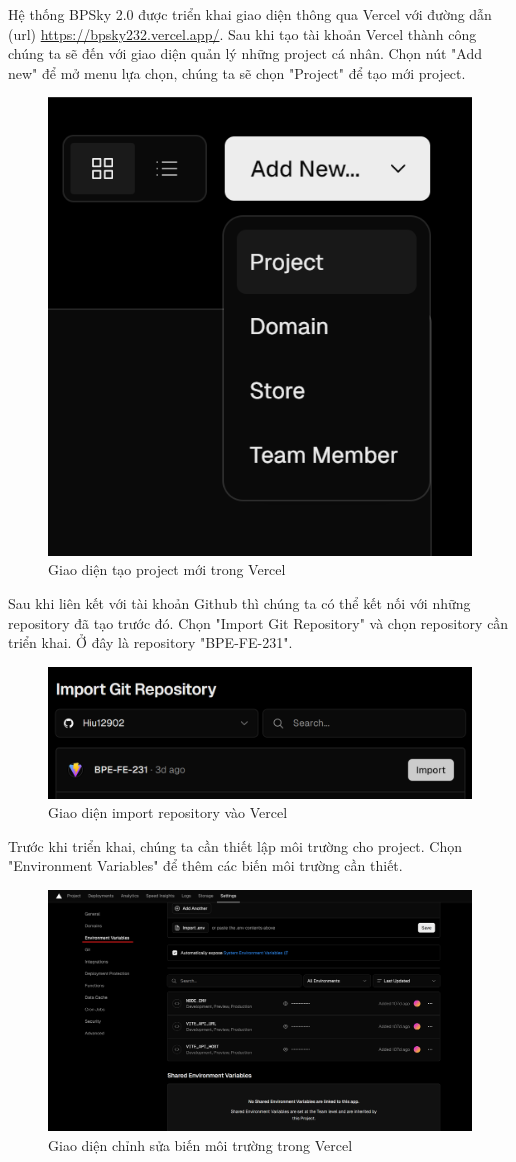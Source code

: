 Hệ thống BPSky 2.0 được triển khai giao diện thông qua Vercel với đường dẫn (url) \url{https://bpsky232.vercel.app/}. Sau khi tạo tài khoản Vercel thành công chúng ta sẽ đến với giao diện quản lý những project cá nhân. Chọn nút "Add new" để mở menu lựa chọn, chúng ta sẽ chọn "Project" để tạo mới project.

\begin{figure}[H]
    \centering
    \includegraphics[width=0.3\linewidth]{Content/Hiện thực hệ thống/images/createProjectVercel.png}
    \vspace{0.5cm}
    \caption{Giao diện tạo project mới trong Vercel}
    \label{fig:Tạo project mới trong Vercel}
\end{figure}

Sau khi liên kết với tài khoản Github thì chúng ta có thể kết nối với những repository đã tạo trước đó. Chọn "Import Git Repository" và chọn repository cần triển khai. Ở đây là repository "BPE-FE-231".

\begin{figure}[H]
    \centering
    \includegraphics[width=0.5\linewidth]{Content/Hiện thực hệ thống/images/importRepoVercel.png}
    \vspace{0.5cm}
    \caption{Giao diện import repository vào Vercel}
    \label{fig:Import repository vào Vercel}
\end{figure}

Trước khi triển khai, chúng ta cần thiết lập môi trường cho project. Chọn "Environment Variables" để thêm các biến môi trường cần thiết.

\begin{figure}[H]
    \centering
    \includegraphics[width=0.7\linewidth]{Content/Hiện thực hệ thống/images/editEnvironmentVariablesVercel.png}
    \vspace{0.5cm}
    \caption{Giao diện chỉnh sửa biến môi trường trong Vercel}
    \label{fig:chỉnh sửa biến môi trường trong Vercel}
\end{figure}

